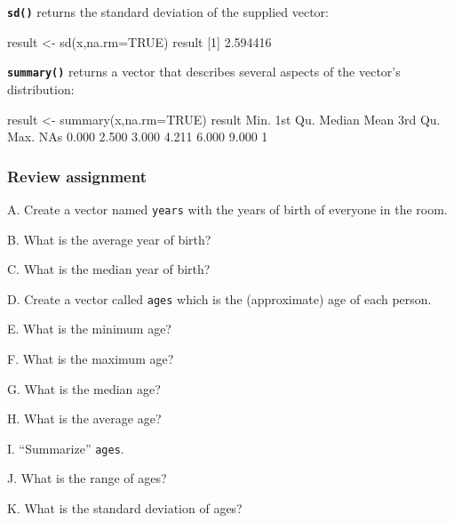 \documentclass[
]{book}
\newenvironment{Shaded}{\begin{snugshade}}{\end{snugshade}}
\newcommand{\AttributeTok}[1]{\textcolor[rgb]{0.77,0.63,0.00}{#1}}
\newcommand{\ConstantTok}[1]{\textcolor[rgb]{0.00,0.00,0.00}{#1}}
\newcommand{\DecValTok}[1]{\textcolor[rgb]{0.00,0.00,0.81}{#1}}
\newcommand{\FloatTok}[1]{\textcolor[rgb]{0.00,0.00,0.81}{#1}}
\newcommand{\FunctionTok}[1]{\textcolor[rgb]{0.00,0.00,0.00}{#1}}
\newcommand{\NormalTok}[1]{#1}
\newcommand{\OtherTok}[1]{\textcolor[rgb]{0.56,0.35,0.01}{#1}}
\newcommand{\StringTok}[1]{\textcolor[rgb]{0.31,0.60,0.02}{#1}}
\begin{document}
\textbf{\texttt{sd()}} returns the standard deviation of the supplied vector:

\begin{Shaded}
\begin{Highlighting}[]
\NormalTok{result }\OtherTok{\textless{}{-}} \FunctionTok{sd}\NormalTok{(x,}\AttributeTok{na.rm=}\ConstantTok{TRUE}\NormalTok{)}
\NormalTok{result}
\NormalTok{[}\DecValTok{1}\NormalTok{] }\FloatTok{2.594416}
\end{Highlighting}
\end{Shaded}

\textbf{\texttt{summary()}} returns a vector that describes several aspects of the vector's distribution:

\begin{Shaded}
\begin{Highlighting}[]
\NormalTok{result }\OtherTok{\textless{}{-}} \FunctionTok{summary}\NormalTok{(x,}\AttributeTok{na.rm=}\ConstantTok{TRUE}\NormalTok{)}
\NormalTok{result}
\NormalTok{   Min. 1st Qu.  Median    Mean 3rd Qu.    Max.    NA}\StringTok{\textquotesingle{}s }
\StringTok{  0.000   2.500   3.000   4.211   6.000   9.000       1 }
\end{Highlighting}
\end{Shaded}

\hypertarget{review-assignment-4}{%
\subsubsection*{Review assignment}\label{review-assignment-4}}

A. Create a vector named \texttt{years} with the years of birth of everyone in the room.

B. What is the average year of birth?

C. What is the median year of birth?

D. Create a vector called \texttt{ages} which is the (approximate) age of each person.

E. What is the minimum age?

F. What is the maximum age?

G. What is the median age?

H. What is the average age?

I. ``Summarize'' \texttt{ages}.

J. What is the range of ages?

K. What is the standard deviation of ages?
\end{document}

